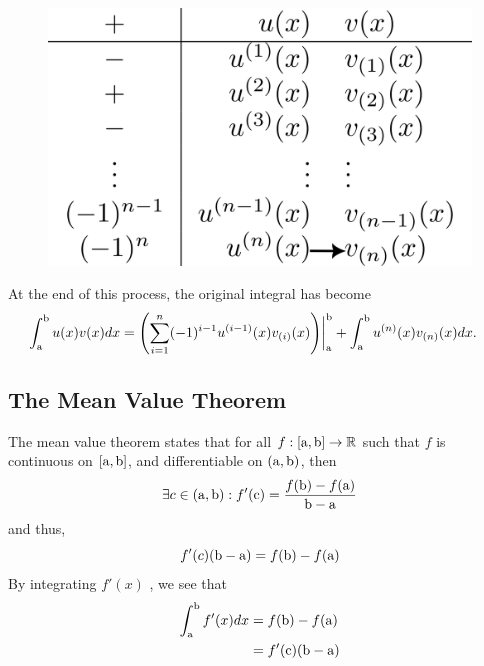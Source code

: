     \begin{figure}[H]
        \centering
        \includegraphics[width=0.34\linewidth]{include/tabular-integrand.png}
    \end{figure}At the end of this process, the original integral has become 
    \begin{equation*}
        \begin{split}
            \int_\mathrm{a}^\mathrm{b} u(x)v(x) dx &= \left(\sum_{i=1}^{n} (-1)^{i-1}u^{(i-1)}(x)v_{(i)}(x)\right)\biggr\rvert_\mathrm{a}^\mathrm{b} + \int_\mathrm{a}^\mathrm{b} u^{(n)}(x)v_{(n)}(x) dx.
        \end{split}
    \end{equation*}
\subsection{The Mean Value Theorem}
    The mean value theorem states that for all \(f:[\mathrm{a},\mathrm{b}]\to \mathbb{R}\) such that \(f\) is continuous on \([\mathrm{a},\mathrm{b}]\), and differentiable on \((\mathrm{a}, \mathrm{b})\), then 
    \begin{equation*}
        \exists c \in (\mathrm{a}, \mathrm{b}) : f'(\text{c}) = \frac{f(\mathrm{b})-f(\mathrm{a})}{\mathrm{b}-\mathrm{a}}
    \end{equation*}
    and thus,
    \begin{equation*}
        f'(c)(\mathrm{b}-\mathrm{a}) = f(\mathrm{b})-f(\mathrm{a})
    \end{equation*}
    By integrating \(f'(x)\) , we see that
    \begin{equation*}
        \begin{split}
            \int_{\mathrm{a}}^{\mathrm{b}} f'(x) dx &= f(\mathrm{b})-f(\mathrm{a})\\
            &=f'(\text{c})(\mathrm{b}-\mathrm{a})
        \end{split}
    \end{equation*}

